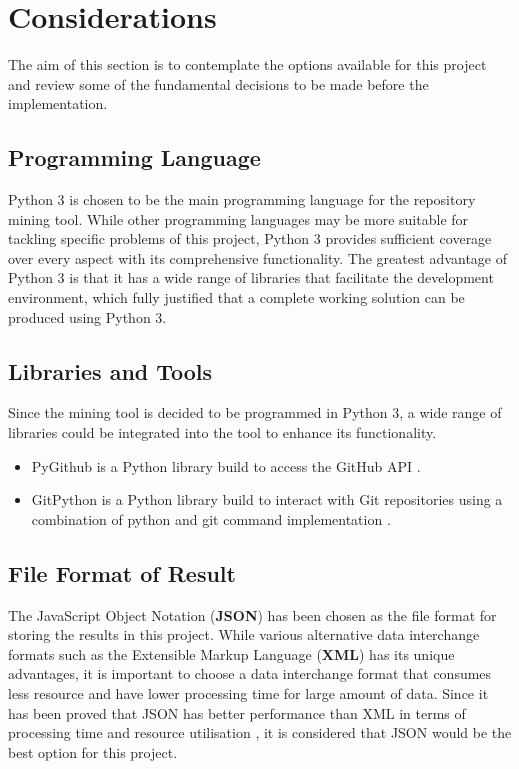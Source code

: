 \documentclass[12pt, a4paper]{report}
\begin{document}
{\section{Considerations}
The aim of this section is to contemplate the options available for this project and review some of
the fundamental decisions to be made before the implementation.

\subsection{Programming Language}
Python 3 \cite{python} is chosen to be the main programming language for the repository mining tool.
While other programming languages may be more suitable for tackling specific problems of this
project, Python 3 provides sufficient coverage over every aspect with its comprehensive
functionality. The greatest advantage of Python 3 is that it has a wide range of libraries that
facilitate the development environment, which fully justified that a complete working solution can
be produced using Python 3.

\subsection{Libraries and Tools}
Since the mining tool is decided to be programmed in Python 3, a wide range of libraries could be
integrated into the tool to enhance its functionality.
\begin{itemize}
	\item PyGithub is a Python library build to access the GitHub API \cite{pygithub}.
	\item GitPython is a Python library build to interact with Git repositories using a combination of
	python and git command implementation \cite{gitpython}.
\end{itemize}

\subsection{File Format of Result}
The JavaScript Object Notation (\textbf{JSON}) \cite{json} has been chosen as the file format for
storing the results in this project. While various alternative data interchange formats such as the
Extensible Markup Language (\textbf{XML}) \cite{xml} has its unique advantages, it is important to
choose a data interchange format that consumes less resource and have lower processing time for
large amount of data. Since it has been proved that JSON has better performance than XML in terms of
processing time and resource utilisation \cite{nurseitov_2009}, it is considered that JSON would be
the best option for this project.

}
\end{document}
